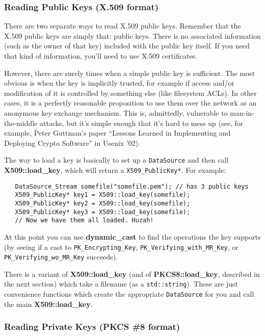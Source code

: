 \documentclass{article}
\newcommand{\function}[1]{\textbf{#1}}
\newcommand{\type}[1]{\texttt{#1}}
\begin{document}
\subsubsection{Reading Public Keys (X.509 format)}

There are two separate ways to read X.509 public keys. Remember that the X.509
public keys are simply that: public keys. There is no associated information
(such as the owner of that key) included with the public key itself. If you
need that kind of information, you'll need to use X.509 certificates.

However, there are surely times when a simple public key is sufficient. The
most obvious is when the key is implicitly trusted, for example if access
and/or modification of it is controlled by something else (like filesystem
ACLs). In other cases, it is a perfectly reasonable proposition to use them
over the network as an anonymous key exchange mechanism. This is, admittedly,
vulnerable to man-in-the-middle attacks, but it's simple enough that it's hard
to mess up (see, for example, Peter Guttman's paper ``Lessons Learned in
Implementing and Deploying Crypto Software'' in Usenix '02).

The way to load a key is basically to set up a \type{DataSource} and then call
\function{X509::load\_key}, which will return a \type{X509\_PublicKey*}. For
example:

\begin{verbatim}
   DataSource_Stream somefile("somefile.pem"); // has 3 public keys
   X509_PublicKey* key1 = X509::load_key(somefile);
   X509_PublicKey* key2 = X509::load_key(somefile);
   X509_PublicKey* key3 = X509::load_key(somefile);
   // Now we have them all loaded. Huzah!
\end{verbatim}

At this point you can use \function{dynamic\_cast} to find the operations the
key supports (by seeing if a cast to \type{PK\_Encrypting\_Key},
\type{PK\_Verifying\_with\_MR\_Key}, or \type{PK\_Verifying\_wo\_MR\_Key}
succeeds).

There is a variant of \function{X509::load\_key} (and of
\function{PKCS8::load\_key}, described in the next section) which take a
filename (as a \type{std::string}). These are just convenience functions which
create the appropriate \type{DataSource} for you and call the main
\function{X509::load\_key}.

\subsubsection{Reading Private Keys (PKCS \#8 format)}
\end{document}

